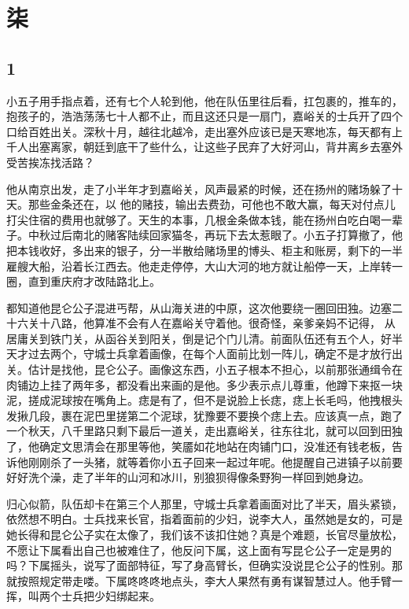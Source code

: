 \section{柒}

{\centering\subsection{1}}

小五子用手指点着，还有七个人轮到他，他在队伍里往后看，扛包裹的，推车的，抱孩子的，浩浩荡荡七十人都不止，而且这还只是一扇门，嘉峪关的士兵开了四个口给百姓出关。深秋十月，越往北越冷，走出塞外应该已是天寒地冻，每天都有上千人出塞离家，朝廷到底干了些什么，让这些子民弃了大好河山，背井离乡去塞外受苦挨冻找活路？

他从南京出发，走了小半年才到嘉峪关，风声最紧的时候，还在扬州的赌场躲了十天。那些金条还在，以
他的赌技，输出去费劲，可他也不敢大赢，每天对付点儿打尖住宿的费用也就够了。天生的本事，几根金条做本钱，能在扬州白吃白喝一辈子。中秋过后南北的赌客陆续回家猫冬，再玩下去太惹眼了。小五子打算撤了，他把本钱收好，多出来的银子，分一半散给赌场里的博头、柜主和账房，剩下的一半雇艘大船，沿着长江西去。他走走停停，大山大河的地方就让船停一天，上岸转一圈，直到重庆府才改陆路北上。

都知道他昆仑公子混进丐帮，从山海关进的中原，这次他要绕一圈回田独。边塞二十六关十八路，他算准不会有人在嘉峪关守着他。很奇怪，亲爹亲妈不记得，
从居庸关到铁门关，从函谷关到阳关，倒是记个门儿清。前面队伍还有五个人，好半天才过去两个，守城士兵拿着画像，在每个人面前比划一阵儿，确定不是才放行出关。估计是找他，昆仑公子。画像这东西，小五子根本不担心，以前那张通缉令在肉铺边上挂了两年多，都没看出来画的是他。多少表示点儿尊重，他蹲下来抠一块泥，搓成泥球按在嘴角上。痣是有了，但不是说脸上长痣，痣上长毛吗，他拽根头发揪几段，裹在泥巴里搓第二个泥球，犹豫要不要换个痣上去。应该真一点，跑了一个秋天，八千里路只剩下最后一道关，走出嘉峪关，往东往北，就可以回到田独了，他确定文思清会在那里等他，笑靥如花地站在肉铺门口，没准还有钱老板，告诉他刚刚杀了一头猪，就等着你小五子回来一起过年呢。他提醒自己进镇子以前要好好洗个澡，走了半年的山河和冰川，别狼狈得像条野狗一样回到她身边。

归心似箭，队伍却卡在第三个人那里，守城士兵拿着画面对比了半天，眉头紧锁，依然想不明白。士兵找来长官，指着面前的少妇，说李大人，虽然她是女的，可是她长得和昆仑公子实在太像了，我们该不该扣住她？真是个难题，长官尽量放松，不愿让下属看出自己也被难住了，他反问下属，这上面有写昆仑公子一定是男的
吗？下属摇头，说写了面部特征，写了身高臂长，但确实没说昆仑公子的性别。那就按照规定带走喽。下属咚咚咚地点头，李大人果然有勇有谋智慧过人。他手臂一挥，叫两个士兵把少妇绑起来。

